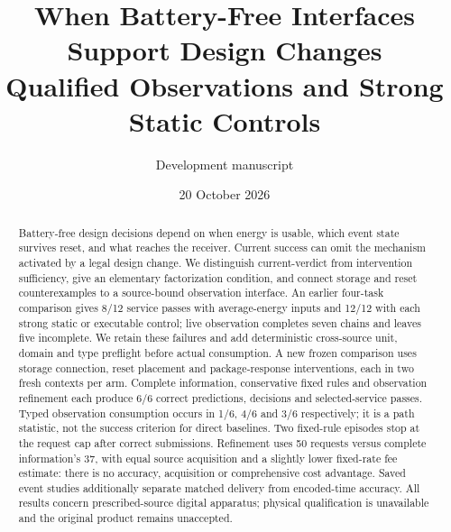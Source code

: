 \documentclass[10pt]{article}
\title{When Battery-Free Interfaces Support Design Changes\\Qualified Observations and Strong Static Controls}
\author{Development manuscript}
\date{20 October 2026}
\begin{document}
\maketitle
\begin{abstract}
Battery-free design decisions depend on when energy is usable, which event
state survives reset, and what reaches the receiver. Current success can omit
the mechanism activated by a legal design change. We distinguish current-verdict
from intervention sufficiency, give an elementary factorization condition, and
connect storage and reset counterexamples to a source-bound observation
interface. An earlier four-task comparison gives 8/12 service passes with
average-energy inputs and 12/12 with each strong static or executable control;
live observation completes seven chains and leaves five incomplete. We retain
these failures and add deterministic cross-source unit, domain and type
preflight before actual consumption. A new frozen comparison uses storage
connection, reset placement and package-response interventions, each in two
fresh contexts per arm. Complete information, conservative fixed rules and
observation refinement each produce 6/6 correct predictions, decisions and
selected-service passes. Typed observation consumption occurs in 1/6, 4/6 and
3/6 respectively; it is a path statistic, not the success criterion for direct
baselines. Two fixed-rule episodes stop at the request cap after correct
submissions. Refinement uses 50 requests versus complete information's 37,
with equal source acquisition and a slightly lower fixed-rate fee estimate:
there is no accuracy, acquisition or comprehensive cost advantage. Saved event
studies additionally separate matched delivery from encoded-time accuracy.
All results concern prescribed-source digital apparatus; physical qualification
is unavailable and the original product remains unaccepted.
\end{abstract}













\FloatBarrier
\end{document}
